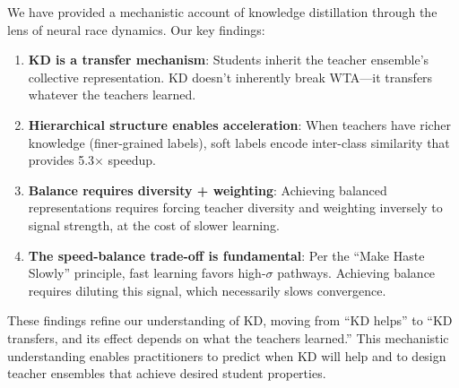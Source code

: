\documentclass{article}
\begin{document}
We have provided a mechanistic account of knowledge distillation through the lens of neural race dynamics. Our key findings:

\begin{enumerate}
    \item \textbf{KD is a transfer mechanism}: Students inherit the teacher ensemble's collective representation. KD doesn't inherently break WTA---it transfers whatever the teachers learned.

    \item \textbf{Hierarchical structure enables acceleration}: When teachers have richer knowledge (finer-grained labels), soft labels encode inter-class similarity that provides 5.3$\times$ speedup.

    \item \textbf{Balance requires diversity + weighting}: Achieving balanced representations requires forcing teacher diversity and weighting inversely to signal strength, at the cost of slower learning.

    \item \textbf{The speed-balance trade-off is fundamental}: Per the ``Make Haste Slowly'' principle, fast learning favors high-$\sigma$ pathways. Achieving balance requires diluting this signal, which necessarily slows convergence.
\end{enumerate}

These findings refine our understanding of KD, moving from ``KD helps'' to ``KD transfers, and its effect depends on what the teachers learned.'' This mechanistic understanding enables practitioners to predict when KD will help and to design teacher ensembles that achieve desired student properties.


\end{document}
